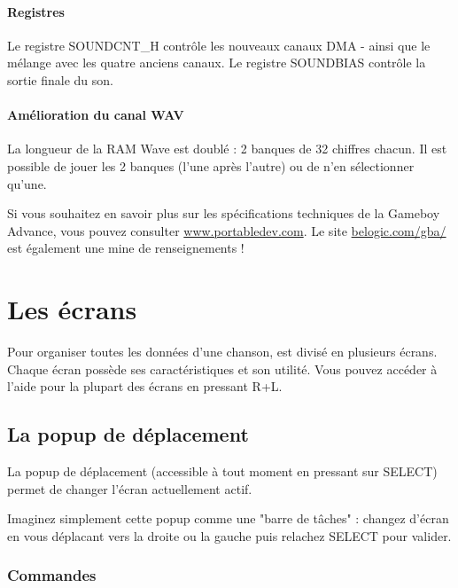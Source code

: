 \documentclass[12pt,a4paper]{article}
\begin{document}
            \paragraph{Registres} Le registre SOUNDCNT\_H contrôle les nouveaux canaux DMA - ainsi que le mélange avec les quatre anciens canaux. Le registre SOUNDBIAS contrôle la sortie finale du son.
            
            \paragraph{Amélioration du canal WAV} La longueur de la RAM Wave est doublé : 2 banques de 32 chiffres chacun. Il est possible de jouer les 2 banques (l'une après l'autre) ou de n'en sélectionner qu'une.
            
            \medskip
  Si vous souhaitez en savoir plus sur les spécifications techniques de la Gameboy Advance, vous pouvez consulter \href{http://www.portabledev.com/media/GBA/tutoriels/gbatek.htm}{www.portabledev.com}. Le site \href{http://belogic.com/gba/}{belogic.com/gba/} est également une mine de renseignements !
        
  \section{Les écrans}
  
    Pour organiser toutes les données d'une chanson, \FAT est divisé en plusieurs écrans. Chaque écran possède ses caractéristiques et son utilité. Vous pouvez accéder à l'aide pour la plupart des écrans en pressant R+L.
  
    \subsection{La popup de déplacement}
    
    La popup de déplacement (accessible à tout moment en pressant sur SELECT) permet de changer l'écran actuellement actif. 
    
    
    Imaginez simplement cette popup comme une "barre de tâches" : changez d'écran en vous déplacant vers la droite ou la gauche puis relachez SELECT pour valider.
    
        \subsubsection{Commandes}
        
\end{document}
